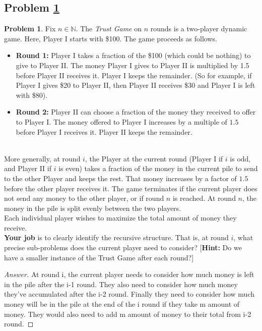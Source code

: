 \documentclass[11pt]{article}
\theoremstyle{definition}
\theoremstyle{definition}
\newtheorem{required}{Problem}
\theoremstyle{definition}
\begin{document}
\subsection{Problem \ref{DP2}}
\begin{required} \label{DP2}
Fix $n \in \mathbb{N}$. The \textit{Trust Game} on $n$ rounds is a two-player dynamic game. Here, Player I starts with \$100. The game proceeds as follows.
\begin{itemize}
\item \textbf{Round 1:} Player I takes a fraction of the \$100 (which could be nothing) to give to Player II. The money Player I gives to Player II is multiplied by 1.5 before Player II receives it. Player I keeps the remainder. (So for example, if Player I gives \$20 to Player II, then Player II receives \$30 and Player I is left with \$80).

\item \textbf{Round 2:} Player II can choose a fraction of the money they received to offer to Player I. The money offered to Player I increases by a multiple of $1.5$  before Player I receives it. Player II keeps the remainder.
\end{itemize}

\noindent \\ More generally, at round $i$, the Player at the current round (Player I if $i$ is odd, and Player II if $i$ is even) takes a fraction of the money in the current pile to send to the other Player and keeps the rest. That money increases by a factor of $1.5$ before the other player receives it. The game terminates if the current player does not send any money to the other player, or if round $n$ is reached. At round $n$, the money in the pile is split evenly between the two players. \\

\noindent Each individual player wishes to maximize the total amount of money they receive. \\

\noindent \textbf{Your job} is to clearly identify the recursive structure. That is, at round $i$, what precise sub-problems does the current player need to consider? [\textbf{Hint:} Do we have a smaller instance of the Trust Game after each round?]
\end{required}

\begin{proof}[Answer]
At round i, the current player needs to consider how much money is left in the pile after the i-1 round. They also need to consider how much money they've accumulated after the i-2 round. Finally they need to consider how much money will be in the pile at the end of the i round if they take m amount of money. They would also need to add m amount of money to their total from i-2 round. 
\end{proof}
\end{document}

